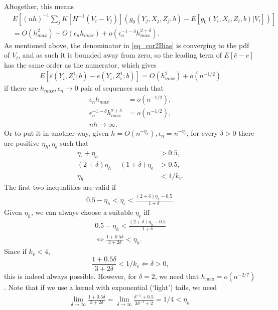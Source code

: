 \documentclass{article}
\theoremstyle{definition}
\theoremstyle{remark}
\begin{document}
Altogether, this means
\begin{align}
&E\left[(nh)^{-1}\sum_j K[H^{-1}(V_i-V_j)] \left(g_0(Y_j, X_j, Z_j, b)-E[g_0(Y_i, X_i, Z_i, b)|V_i]\right)\right] \nonumber \\
&= O(h^2_{max})+O(\epsilon_n h_{max}) + o(\epsilon_n^{-1-\delta}h_{max}^{2+\delta}). 
\end{align}
As mentioned above, the denominator in \eqref{eq_cor2Bias} is converging to the pdf of $V_i$, and as such it is bounded away from zero, so the leading term of $E[\hat{e}-e]$ has the same order as the numerator, which gives
\begin{align}
E[\hat{e}(Y_i,Z_i^1;b)-e(Y_i,Z_i^1;b)] = O(h^2_{max})+ o(n^{-1/2}) 
\end{align}
if there are $h_{max},\epsilon_n \rightarrow 0$ pair of sequences such that
\begin{align}
\epsilon_n h_{max} &= o(n^{-1/2}),\\
\epsilon_n ^{-1-\delta}h_{max}^{2+\delta}&=o(n^{-1/2}), \\
nh \rightarrow \infty.
\end{align}
Or to put it in another way, given $h=O(n^{-\eta_h}), \epsilon_n=n^{-\eta_\epsilon}$, for every $\delta>0$ there are positive $\eta_h, \eta_{\epsilon}$ such that
\begin{align}
	\eta_\epsilon + \eta_h &> 0.5, \\
	(2+\delta) \eta_h -(1+\delta)\eta_\epsilon &>0.5,\\
	\eta_h &< 1/k_v.
\end{align}
The first two inequalities are valid if
\begin{align}
0.5 - \eta_h < \eta_\epsilon < \frac{(2+\delta)\eta_h - 0.5}{1+\delta}.
\end{align}
Given $\eta_h$, we can always choose a suitable $\eta_\epsilon$ iff
\begin{align}
0.5 - \eta_h < \frac{(2+\delta)\eta_h - 0.5}{1+\delta}  \\
\iff \frac{1+0.5 \delta}{3 + 2\delta} < \eta_h.
\end{align}
Since if $k_v <4$,
\[\frac{1+0.5 \delta}{3 + 2\delta} <1/k_v \Leftarrow \delta>0,
\]
this is indeed always possible. However, for $\delta=2$, we need that $h_{\max}=o(n^{-2/7})$. Note that if we use a kernel with exponential (`light') tails, we need
\begin{align}
\lim_{\delta\rightarrow \infty}\frac{1+0.5\delta}{3+2\delta} = \lim_{\delta\rightarrow \infty}\frac{\delta^{-1}+0.5}{3\delta^{-1}+2}=1/4 < \eta_h.
\end{align}
\end{document}
